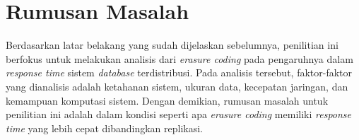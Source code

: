 \section{Rumusan Masalah}

Berdasarkan latar belakang yang sudah dijelaskan sebelumnya, penilitian ini berfokus untuk melakukan analisis dari \textit{erasure coding} pada pengaruhnya dalam \textit{response time} sistem \textit{database} terdistribusi. Pada analisis tersebut, faktor-faktor yang dianalisis adalah ketahanan sistem, ukuran data, kecepatan jaringan, dan kemampuan komputasi sistem. Dengan demikian, rumusan masalah untuk penilitian ini adalah dalam kondisi seperti apa \textit{erasure coding} memiliki \textit{response time} yang lebih cepat dibandingkan replikasi.
